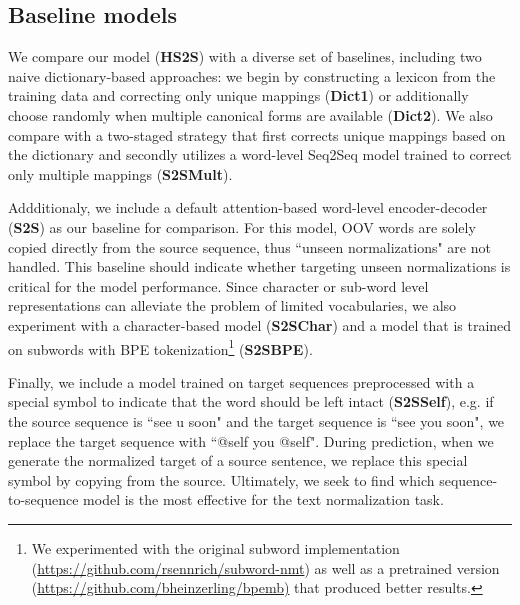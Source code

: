 \documentclass[letterpaper]{article} \usepackage{aaai19}  \usepackage{times}  \usepackage{helvet} \usepackage{courier}  \usepackage[hyphens]{url}  \usepackage{graphicx} \urlstyle{rm} \def\UrlFont{\rm}  \usepackage{graphicx}  \frenchspacing  \setlength{\pdfpagewidth}{8.5in}  \setlength{\pdfpageheight}{11in}
\newcommand{\citep}{\cite}
\begin{document}
\begin{table}
  \centering
      \caption{LexNorm statistics from \citep{baldwin2015shared} and vocabulary statistics after preprocessing}
  \label{table:stats}
\end{table}

\subsection{Baseline models}\label{baselines}
We compare our model (\textbf{HS2S})  with a diverse set of baselines, including two naive dictionary-based approaches: we begin by constructing a lexicon from the training data and correcting only unique mappings (\textbf{Dict1}) or additionally choose randomly when multiple canonical forms are available (\textbf{Dict2}). We also compare with a two-staged strategy that first corrects unique mappings based on the dictionary and secondly utilizes a word-level Seq2Seq model trained to correct only multiple mappings (\textbf{S2SMult}). 

Addditionaly, we include a default attention-based word-level encoder-decoder (\textbf{S2S}) as our baseline for comparison. For this model, OOV words are solely copied directly from the source sequence, thus ``unseen normalizations" are not handled. This baseline should indicate whether targeting unseen normalizations is critical for the model performance. Since character or sub-word level representations can alleviate the problem of limited vocabularies, we also experiment with a character-based model  (\textbf{S2SChar}) and a model that is trained on subwords with BPE tokenization\footnote{We experimented with the original subword implementation (\url{https://github.com/rsennrich/subword-nmt}) as well as a pretrained version \cite{heinzerling2018bpemb} (\url{https://github.com/bheinzerling/bpemb)} that produced better results.} (\textbf{S2SBPE}). 

Finally, we include a model trained on target sequences preprocessed with a special symbol to indicate that the word should be left intact (\textbf{S2SSelf}), e.g. if the source sequence is ``see u soon" and the target sequence is ``see you soon", we replace the target sequence with ``@self you @self".
During prediction, when we generate the normalized target of a source sentence, we replace this special symbol by copying from the source. Ultimately, we seek to find which sequence-to-sequence model is the most effective for the text normalization task.
\end{document}

